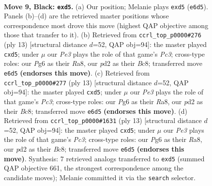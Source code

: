 \documentclass[11pt]{article}
\begin{document}
\clearpage

\begin{figure}[p]\centering
\begin{subfigure}{0.46\textwidth}\centering
\resizebox{\linewidth}{!}{%
\newchessgame
\chessboard[
  setfen={rnbq1rk1/1p2bp1p/4pnp1/p1pP4/P7/1P3NP1/3PPPBP/RNBQ1RK1 b - - 0 9},
  showmover=false,
  pgfstyle=straightmove, color=movearrow, markmove={e6-d5}
]}
\caption{}
\end{subfigure}\hfill
\begin{subfigure}{0.46\textwidth}\centering
\resizebox{\linewidth}{!}{%
\newchessgame
\chessboard[
  setfen={rnbq1rk1/pp2ppbp/2p2np1/3P4/3P4/5NP1/PP2PPBP/RNBQ1RK1 b - - 0 7},
  showmover=false,
  pgfstyle=straightmove, color=movearrow, markmove={c6-d5}
]}
\caption{}
\end{subfigure}
\\[4pt]
\begin{subfigure}{0.46\textwidth}\centering
\resizebox{\linewidth}{!}{%
\newchessgame
\chessboard[
  setfen={rnbq1rk1/pp2ppbp/2p2np1/3P4/3P4/5NP1/PP2PPBP/RNBQ1RK1 b - - 0 7},
  showmover=false,
  pgfstyle=straightmove, color=movearrow, markmove={c6-d5}
]}
\caption{}
\end{subfigure}\hfill
\begin{subfigure}{0.46\textwidth}\centering
\resizebox{\linewidth}{!}{%
\newchessgame
\chessboard[
  setfen={rnbq1rk1/pp2ppbp/2p2np1/3P4/3P4/5NP1/PP2PPBP/RNBQ1RK1 b - - 0 7},
  showmover=false,
  pgfstyle=straightmove, color=movearrow, markmove={c6-d5}
]}
\caption{}
\end{subfigure}
\caption{\textbf{Move 9, Black: \texttt{exd5}.} (a) Our position; Melanie plays \texttt{exd5} (\texttt{e6d5}). Panels (b)--(d) are the retrieved master positions whose correspondence most drove this move (highest QAP objective among those that transfer to it). (b) Retrieved from \texttt{ccrl\_top\_p0000\#276} (ply 13) [structural distance $d$=52, QAP obj=94]: the master played \texttt{cxd5}; under $\mu$ our \emph{Pe3} plays the role of that game's \emph{Pc3}; cross-type roles: our \emph{P}g6 as their \emph{R}a8, our \emph{p}d2 as their \emph{B}c8; transferred move \texttt{e6d5} \textbf{(endorses this move)}. (c) Retrieved from \texttt{ccrl\_top\_p0000\#277} (ply 13) [structural distance $d$=52, QAP obj=94]: the master played \texttt{cxd5}; under $\mu$ our \emph{Pe3} plays the role of that game's \emph{Pc3}; cross-type roles: our \emph{P}g6 as their \emph{R}a8, our \emph{p}d2 as their \emph{B}c8; transferred move \texttt{e6d5} \textbf{(endorses this move)}. (d) Retrieved from \texttt{ccrl\_top\_p0000\#1631} (ply 13) [structural distance $d$=52, QAP obj=94]: the master played \texttt{cxd5}; under $\mu$ our \emph{Pe3} plays the role of that game's \emph{Pc3}; cross-type roles: our \emph{P}g6 as their \emph{R}a8, our \emph{p}d2 as their \emph{B}c8; transferred move \texttt{e6d5} \textbf{(endorses this move)}. Synthesis: 7 retrieved analogs transferred to \texttt{exd5} (summed QAP objective 661, the strongest correspondence among the candidate moves); Melanie committed it via the \texttt{search} selector.}
\label{fig:thought-m17}
\end{figure}
\end{document}
